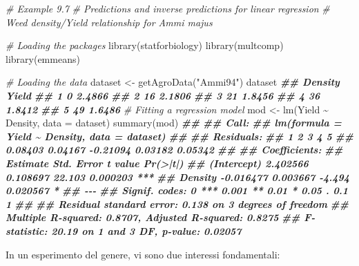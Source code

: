 \documentclass[
  12pt,
]{book}
\newenvironment{Shaded}{\begin{snugshade}}{\end{snugshade}}
\newcommand{\AttributeTok}[1]{\textcolor[rgb]{0.77,0.63,0.00}{#1}}
\newcommand{\CommentTok}[1]{\textcolor[rgb]{0.56,0.35,0.01}{\textit{#1}}}
\newcommand{\DocumentationTok}[1]{\textcolor[rgb]{0.56,0.35,0.01}{\textbf{\textit{#1}}}}
\newcommand{\FunctionTok}[1]{\textcolor[rgb]{0.00,0.00,0.00}{#1}}
\newcommand{\NormalTok}[1]{#1}
\newcommand{\OtherTok}[1]{\textcolor[rgb]{0.56,0.35,0.01}{#1}}
\newcommand{\SpecialCharTok}[1]{\textcolor[rgb]{0.00,0.00,0.00}{#1}}
\newcommand{\StringTok}[1]{\textcolor[rgb]{0.31,0.60,0.02}{#1}}
\begin{document}
\begin{Shaded}
\begin{Highlighting}[]
\CommentTok{\# Example 9.7}
\CommentTok{\# Predictions and inverse predictions for linear regression}
\CommentTok{\# Weed density/Yield relationship for Ammi majus}

\CommentTok{\# Loading the packages}
\FunctionTok{library}\NormalTok{(statforbiology)}
\FunctionTok{library}\NormalTok{(multcomp)}
\FunctionTok{library}\NormalTok{(emmeans)}

\CommentTok{\# Loading the data}
\NormalTok{dataset }\OtherTok{\textless{}{-}} \FunctionTok{getAgroData}\NormalTok{(}\StringTok{"Ammi94"}\NormalTok{)}
\NormalTok{dataset}
\DocumentationTok{\#\#   Density  Yield}
\DocumentationTok{\#\# 1       0 2.4866}
\DocumentationTok{\#\# 2      16 2.1806}
\DocumentationTok{\#\# 3      21 1.8456}
\DocumentationTok{\#\# 4      36 1.8412}
\DocumentationTok{\#\# 5      49 1.6486}
\CommentTok{\# Fitting a regression model}
\NormalTok{mod }\OtherTok{\textless{}{-}} \FunctionTok{lm}\NormalTok{(Yield }\SpecialCharTok{\textasciitilde{}}\NormalTok{ Density, }\AttributeTok{data =}\NormalTok{ dataset)}
\FunctionTok{summary}\NormalTok{(mod)}
\DocumentationTok{\#\# }
\DocumentationTok{\#\# Call:}
\DocumentationTok{\#\# lm(formula = Yield \textasciitilde{} Density, data = dataset)}
\DocumentationTok{\#\# }
\DocumentationTok{\#\# Residuals:}
\DocumentationTok{\#\#        1        2        3        4        5 }
\DocumentationTok{\#\#  0.08403  0.04167 {-}0.21094  0.03182  0.05342 }
\DocumentationTok{\#\# }
\DocumentationTok{\#\# Coefficients:}
\DocumentationTok{\#\#              Estimate Std. Error t value Pr(\textgreater{}|t|)    }
\DocumentationTok{\#\# (Intercept)  2.402566   0.108697  22.103 0.000203 ***}
\DocumentationTok{\#\# Density     {-}0.016477   0.003667  {-}4.494 0.020567 *  }
\DocumentationTok{\#\# {-}{-}{-}}
\DocumentationTok{\#\# Signif. codes:  0 \textquotesingle{}***\textquotesingle{} 0.001 \textquotesingle{}**\textquotesingle{} 0.01 \textquotesingle{}*\textquotesingle{} 0.05 \textquotesingle{}.\textquotesingle{} 0.1 \textquotesingle{} \textquotesingle{} 1}
\DocumentationTok{\#\# }
\DocumentationTok{\#\# Residual standard error: 0.138 on 3 degrees of freedom}
\DocumentationTok{\#\# Multiple R{-}squared:  0.8707, Adjusted R{-}squared:  0.8275 }
\DocumentationTok{\#\# F{-}statistic: 20.19 on 1 and 3 DF,  p{-}value: 0.02057}
\end{Highlighting}
\end{Shaded}

In un esperimento del genere, vi sono due interessi fondamentali:
\end{document}
